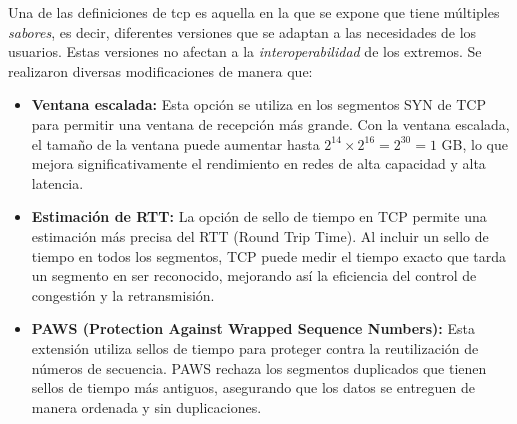 \documentclass[a4paper,12pt]{article}
\begin{document}
\begin{itemize}
Una de las definiciones de tcp es aquella en la que se expone que tiene múltiples \textit{sabores}, es decir, diferentes versiones que se adaptan a las necesidades de los usuarios. Estas versiones no afectan a la \textit{interoperabilidad} de los extremos. Se realizaron diversas modificaciones de manera que:
\begin{itemize}
    \item \textbf{Ventana escalada:} Esta opción se utiliza en los segmentos SYN de TCP para permitir una ventana de recepción más grande. Con la ventana escalada, el tamaño de la ventana puede aumentar hasta $2^{14} \times 2^{16} = 2^{30} = 1$ GB, lo que mejora significativamente el rendimiento en redes de alta capacidad y alta latencia.
    \item \textbf{Estimación de RTT:} La opción de sello de tiempo en TCP permite una estimación más precisa del RTT (Round Trip Time). Al incluir un sello de tiempo en todos los segmentos, TCP puede medir el tiempo exacto que tarda un segmento en ser reconocido, mejorando así la eficiencia del control de congestión y la retransmisión.
    \item \textbf{PAWS (Protection Against Wrapped Sequence Numbers):} Esta extensión utiliza sellos de tiempo para proteger contra la reutilización de números de secuencia. PAWS rechaza los segmentos duplicados que tienen sellos de tiempo más antiguos, asegurando que los datos se entreguen de manera ordenada y sin duplicaciones.
\end{itemize}


\end{itemize}
















\end{document}
